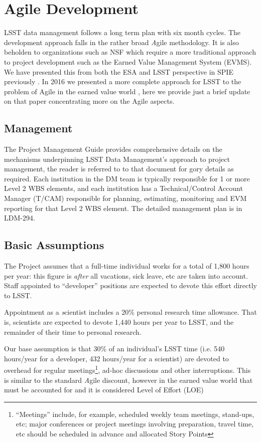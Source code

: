 \section{Agile Development}\label{sec:agile}

LSST data management follows a long term plan with six month cycles. The  development approach falls in the rather  broad {\emph Agile} methodology. It is also beholden to organizations such as NSF which require a more traditional approach to project development such as the Earned Value Management System (EVMS).
We have presented this from both  the ESA and LSST perspective in SPIE previously  \cite{2014SPIE.9150E..1EG}.
In 2016  we presented a more complete approach for LSST to the problem of Agile in the earned value world \cite{2016SPIE.9911E..0NK}, here we provide just a brief update on that paper concentrating more on the Agile aspects.


\subsection{Management}
The Project Management Guide \cite{DMTN-020} provides  comprehensive details on the mechanisms underpinning LSST Data Management’s approach to project management, the reader is referred to to that document for gory details as required.
Each institution in the DM team is typically
responsible for 1 or more Level 2 WBS elements, and each institution has a Technical/Control Account Manager
(T/CAM) responsible for planning, estimating, monitoring and EVM reporting for that Level 2 WBS element.
The detailed management plan is in LDM-294\cite{LDM-294}.

\subsection{Basic Assumptions}
The Project assumes that a full-time individual works for a total of
1,800 hours per year: this figure is \emph{after} all vacations, sick
leave, etc are taken into account. Staff appointed to ``developer''
positions are expected to devote this effort directly to LSST.

Appointment as a {\emph scientist} includes a 20\% personal research time
allowance. That is, scientists are expected to devote 1,440 hours per
year to LSST, and the remainder of their time to personal research.

Our base assumption is that 30\% of an individual's LSST time (i.e. 540 hours/year for a developer, 432 hours/year for a scientist) are devoted to overhead for regular meetings\footnote{``Meetings'' include, for example, scheduled weekly team meetings, stand-ups, etc; major conferences or project meetings involving preparation, travel time, etc should be scheduled in advance and allocated Story Points}, ad-hoc discussions and other interruptions.
This is similar to the standard {\emph Agile} discount, however in the earned value world that must be accounted for and it is considered Level of Effort (LOE)


